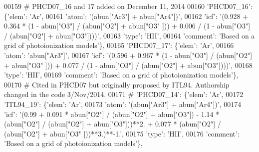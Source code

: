 \begin{DoxyCode}
00159 \textcolor{comment}{# PHCD07\_16 and 17 added on December 11, 2014}
00160                          \textcolor{stringliteral}{'PHCD07\_16'}: \{\textcolor{stringliteral}{'elem'}: \textcolor{stringliteral}{'Ar'},
00161                                        \textcolor{stringliteral}{'atom'}: \textcolor{stringliteral}{'(abun["Ar3"] + abun["Ar4"])'},
00162                                        \textcolor{stringliteral}{'icf'}: \textcolor{stringliteral}{'(0.928 + 0.364 * (1 - abun["O3"] / (abun["O2"] + abun["O3"
      ])) + 0.006 / (1 - abun["O3"] / (abun["O2"] + abun["O3"])))'},
00163                                        \textcolor{stringliteral}{'type'}: \textcolor{stringliteral}{'HII'},
00164                                        \textcolor{stringliteral}{'comment'}: \textcolor{stringliteral}{'Based on a grid of photoionization models'}\},
00165                          \textcolor{stringliteral}{'PHCD07\_17'}: \{\textcolor{stringliteral}{'elem'}: \textcolor{stringliteral}{'Ar'},
00166                                        \textcolor{stringliteral}{'atom'}: \textcolor{stringliteral}{'abun["Ar3"]'},
00167                                        \textcolor{stringliteral}{'icf'}: \textcolor{stringliteral}{'(0.596 + 0.967 * (1 - abun["O3"] / (abun["O2"] + abun["O3"
      ])) + 0.077 / (1 - abun["O3"] / (abun["O2"] + abun["O3"])))'},
00168                                        \textcolor{stringliteral}{'type'}: \textcolor{stringliteral}{'HII'},
00169                                        \textcolor{stringliteral}{'comment'}: \textcolor{stringliteral}{'Based on a grid of photoionization models'}\},
00170 \textcolor{comment}{# Cited in PHCD07 but originally proposed by ITL94. Authorship changed in the code 3/Nov/2014. }
00171 \textcolor{comment}{#                         'PHCD07\_14': \{'elem': 'Ar',}
00172                          \textcolor{stringliteral}{'ITL94\_19'}: \{\textcolor{stringliteral}{'elem'}: \textcolor{stringliteral}{'Ar'},
00173                                        \textcolor{stringliteral}{'atom'}: \textcolor{stringliteral}{'(abun["Ar3"] + abun["Ar4"])'},
00174                                        \textcolor{stringliteral}{'icf'}: \textcolor{stringliteral}{'(0.99 + 0.091 * abun["O2"] / (abun["O2"] + abun["O3"]) -
       1.14 * (abun["O2"] / (abun["O2"] + abun["O3"]))**2. + 0.077 * (abun["O2"] / (abun["O2"] + abun["O3"
      ]))**3.)**-1.'},
00175                                        \textcolor{stringliteral}{'type'}: \textcolor{stringliteral}{'HII'},
00176                                        \textcolor{stringliteral}{'comment'}: \textcolor{stringliteral}{'Based on a grid of photoionization models'}\},

\end{DoxyCode}
